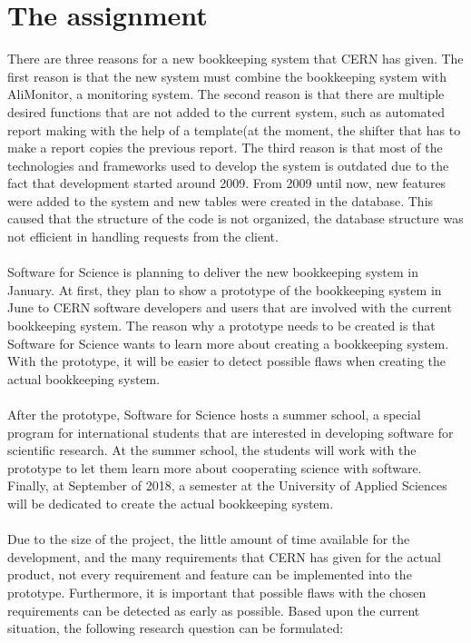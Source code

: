 \documentclass[paper=a4, fontsize=11pt,twoside]{scrartcl}	%
\begin{document}
\section{The assignment}
There are three reasons for a new bookkeeping system that CERN has given. The first reason is that the new system must combine the bookkeeping system with AliMonitor, a monitoring system. The second reason is that there are multiple desired functions that are not added to the current system, such as automated report making with the help of a template(at the moment, the shifter that has to make a report copies the previous report. The third reason is that most of the technologies and frameworks used to develop the system is outdated due to the fact that development started around 2009. From 2009 until now, new features were added to the system and new tables were created in the database. This caused that the structure of the code is not organized, the database structure was not efficient in handling requests from the client. \\ \\
Software for Science is planning to deliver the new bookkeeping system in January. At first, they plan to show a prototype of the bookkeeping system in June to CERN software developers and users that are involved with the current bookkeeping system. The reason why a prototype needs to be created is that Software for Science wants to learn more about creating a bookkeeping system. With the prototype, it will be easier to detect possible flaws when creating the actual bookkeeping system. \\ \\
After the prototype, Software for Science hosts a summer school, a special program for international students that are interested in developing software for scientific research. At the summer school, the students will work with the prototype to let them learn more about cooperating science with software. Finally, at September of 2018, a semester at the University of Applied Sciences will be dedicated to create the actual bookkeeping system. \\ \\ 
Due to the size of the project, the little amount of time available for the development, and the many requirements that CERN has given for the actual product, not every requirement and feature can be implemented into the prototype. Furthermore, it is important that possible flaws with the chosen requirements can be detected as early as possible. Based upon the current situation, the following research question can be formulated: \\ \\
\end{document}
